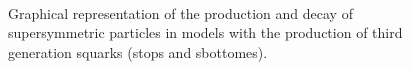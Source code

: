 \begin{figure}[h!]
    \begin{center}
        ~~
        ~~
        ~~
        \caption{
            Graphical representation of the production and decay of
            supersymmetric particles in models with the production of third
            generation squarks (stops and sbottomes).
        }
        \label{fig:simplified-models-feyn-3rdGen}
    \end{center}
\end{figure}

